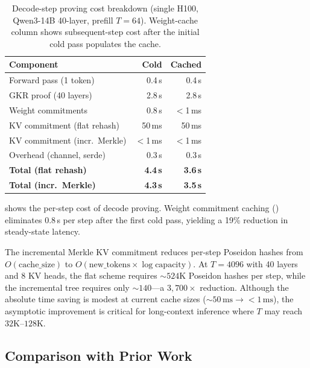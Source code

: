 \documentclass[10pt,twocolumn]{article}
\theoremstyle{definition}
\theoremstyle{remark}
\begin{document}
\begin{table}[t]
  \centering\small
  \caption{Decode-step proving cost breakdown (single H100,
           Qwen3-14B 40-layer, prefill $T\!=\!64$).
           Weight-cache column shows subsequent-step cost
           after the initial cold pass populates the cache.}
  \label{tab:decode-step}
  \begin{tabular}{@{}lrr@{}}
    \toprule
    \textbf{Component}
      & \textbf{Cold}
      & \textbf{Cached} \\
    \midrule
    Forward pass (1 token)        & 0.4\,s  & 0.4\,s \\
    GKR proof (40 layers)         & 2.8\,s  & 2.8\,s \\
    Weight commitments            & 0.8\,s  & $<$1\,ms \\
    KV commitment (flat rehash)   & 50\,ms  & 50\,ms \\
    KV commitment (incr.\ Merkle) & $<$1\,ms & $<$1\,ms \\
    Overhead (channel, serde)     & 0.3\,s  & 0.3\,s \\
    \midrule
    \textbf{Total (flat rehash)}  & \textbf{4.4\,s} & \textbf{3.6\,s} \\
    \textbf{Total (incr.\ Merkle)}& \textbf{4.3\,s} & \textbf{3.5\,s} \\
    \bottomrule
  \end{tabular}
\end{table}

 shows the per-step cost of decode proving.
Weight commitment caching () eliminates 0.8\,s
per step after the first cold pass, yielding a 19\% reduction in
steady-state latency.

The incremental Merkle KV commitment reduces per-step Poseidon
hashes from $O(\text{cache\_size})$ to
$O(\text{new\_tokens} \times \log \text{capacity})$.
At $T\!=\!4096$ with 40 layers and 8 KV heads, the flat scheme
requires ${\sim}524\text{K}$ Poseidon hashes per step, while the
incremental tree requires only ${\sim}140$---a $3{,}700\times$
reduction.  Although the absolute time saving is modest at current
cache sizes (${\sim}50\,\text{ms} \to {<}1\,\text{ms}$), the
asymptotic improvement is critical for long-context inference where
$T$ may reach $32\text{K}$--$128\text{K}$.

\subsection{Comparison with Prior Work}
\end{document}
